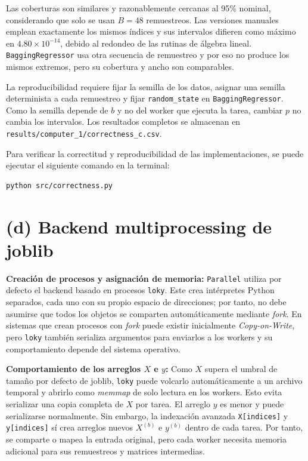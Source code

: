\documentclass[12pt, letterpaper]{article}
\begin{document}
Las coberturas son similares y razonablemente cercanas al 95\% nominal,
considerando que solo se usan $B=48$ remuestreos. Las versiones manuales
emplean exactamente los mismos índices y sus intervalos difieren como máximo
en $4.80\times10^{-14}$, debido al redondeo de las rutinas de álgebra lineal.
\texttt{BaggingRegressor} usa otra secuencia de remuestreo y por eso no produce
los mismos extremos, pero su cobertura y ancho son comparables.

La reproducibilidad requiere fijar la semilla de los datos, asignar una semilla
determinista a cada remuestreo y fijar \texttt{random\_state} en
\texttt{BaggingRegressor}. Como la semilla depende de $b$ y no del worker que
ejecuta la tarea, cambiar $p$ no cambia los intervalos. Los resultados completos
se almacenan en \texttt{results/computer\_1/correctness\_c.csv}.

Para verificar la correctitud y reproducibilidad de las implementaciones, se puede ejecutar el siguiente comando en la terminal:
\begin{verbatim}
python src/correctness.py
\end{verbatim}

\section*{(d) Backend multiprocessing de joblib}

\textbf{Creación de procesos y asignación de memoria:}
\texttt{Parallel} utiliza por defecto el backend basado en procesos
\texttt{loky}. Este crea intérpretes Python separados, cada uno con su propio
espacio de direcciones; por tanto, no debe asumirse que todos los objetos se
comparten automáticamente mediante \textit{fork}. En sistemas que crean procesos
con \textit{fork} puede existir inicialmente \textit{Copy-on-Write}, pero
\texttt{loky} también serializa argumentos para enviarlos a los workers y su
comportamiento depende del sistema operativo.

\textbf{Comportamiento de los arreglos $X$ e $y$:}
Como $X$ supera el umbral de tamaño por defecto de joblib, \texttt{loky} puede
volcarlo automáticamente a un archivo temporal y abrirlo como \textit{memmap} de
solo lectura en los workers. Esto evita serializar una copia completa de $X$ por
tarea. El arreglo $y$ es menor y puede serializarse normalmente. Sin embargo,
la indexación avanzada \texttt{X[indices]} y \texttt{y[indices]} sí crea
arreglos nuevos $X^{(b)}$ e $y^{(b)}$ dentro de cada tarea. Por tanto, se
comparte o mapea la entrada original, pero cada worker necesita memoria
adicional para sus remuestreos y matrices intermedias.
\end{document}
